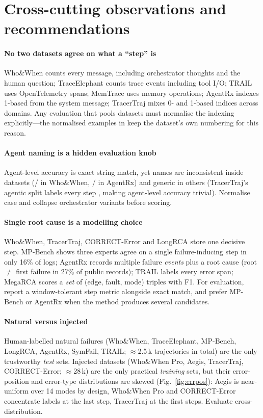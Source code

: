 \section{Cross-cutting observations and recommendations}\label{sec:reco}

\paragraph{No two datasets agree on what a ``step'' is} Who\&When counts every message, including orchestrator thoughts and the human question; TraceElephant counts trace events including tool I/O; TRAIL uses OpenTelemetry spans; MemTrace uses memory operations; AgentRx indexes 1-based from the system message; TracerTraj mixes 0- and 1-based indices across domains. Any evaluation that pools datasets must normalise the indexing explicitly---the normalised examples in  keep the dataset's own numbering for this reason.

\paragraph{Agent naming is a hidden evaluation knob} Agent-level accuracy is exact string match, yet names are inconsistent inside datasets (/ in Who\&When, / in AgentRx) and generic in others (TracerTraj's agentic split labels every step , making agent-level accuracy trivial). Normalise case and collapse orchestrator variants before scoring.

\paragraph{Single root cause is a modelling choice} Who\&When, TracerTraj, CORRECT-Error and LongRCA store one decisive step. MP-Bench shows three experts agree on a single failure-inducing step in only 16\% of logs; AgentRx records multiple failure \emph{events} plus a root cause (root $\ne$ first failure in 27\% of public records); TRAIL labels every error span; MegaRCA scores a \emph{set} of (edge, fault, mode) triples with F1. For evaluation, report a window-tolerant step metric alongside exact match, and prefer MP-Bench or AgentRx when the method produces several candidates.

\paragraph{Natural versus injected} Human-labelled natural failures (Who\&When, TraceElephant, MP-Bench, LongRCA, AgentRx, SymFail, TRAIL; $\approx$2.5\,k trajectories in total) are the only trustworthy \emph{test} sets. Injected datasets (Who\&When Pro, Aegis, TracerTraj, CORRECT-Error; $\approx$28\,k) are the only practical \emph{training} sets, but their error-position and error-type distributions are skewed (Fig.~\ref{fig:errpos}): Aegis is near-uniform over 14 modes by design, Who\&When Pro and CORRECT-Error concentrate labels at the last step, TracerTraj at the first steps. Evaluate cross-distribution.

